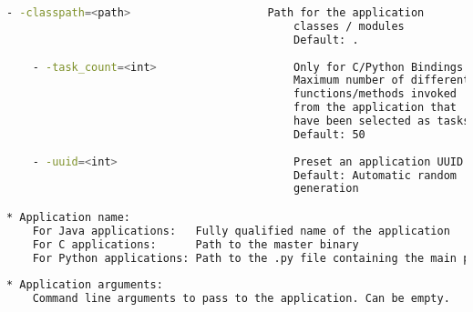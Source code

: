 \begin{lstlisting}[language=bash]
    - -classpath=<path>                     Path for the application  
                                            classes / modules
                                            Default: .
                                            
    - -task_count=<int>                     Only for C/Python Bindings. 
                                            Maximum number of different 
                                            functions/methods invoked 
                                            from the application that 
                                            have been selected as tasks
                                            Default: 50
                                            
    - -uuid=<int>                           Preset an application UUID
                                            Default: Automatic random 
                                            generation

* Application name:
    For Java applications:   Fully qualified name of the application
    For C applications:      Path to the master binary
    For Python applications: Path to the .py file containing the main program
    
* Application arguments:
    Command line arguments to pass to the application. Can be empty. 
                                            
\end{lstlisting}
